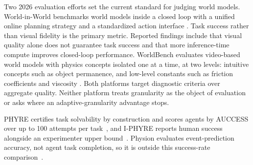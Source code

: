 Two 2026 evaluation efforts set the current standard for judging world models. World-in-World benchmarks world models inside a closed loop with a unified online planning strategy and a standardized action interface \citep{zhang2026worldinworld}. Task success rather than visual fidelity is the primary metric. Reported findings include that visual quality alone does not guarantee task success and that more inference-time compute improves closed-loop performance. WorldBench evaluates video-based world models with physics concepts isolated one at a time, at two levels: intuitive concepts such as object permanence, and low-level constants such as friction coefficients and viscosity \citep{upadhyay2026worldbench}. Both platforms target diagnostic criteria over aggregate quality. Neither platform treats granularity as the object of evaluation or asks where an adaptive-granularity advantage stops.

PHYRE certifies task solvability by construction and scores agents by AUCCESS over up to 100 attempts per task~\citep{bakhtin2019phyre}, and I-PHYRE reports human success alongside an experimenter upper bound~\citep{li2024iphyre}. Physion evaluates event-prediction accuracy, not agent task completion, so it is outside this success-rate comparison~\citep{bear2021physion}.

